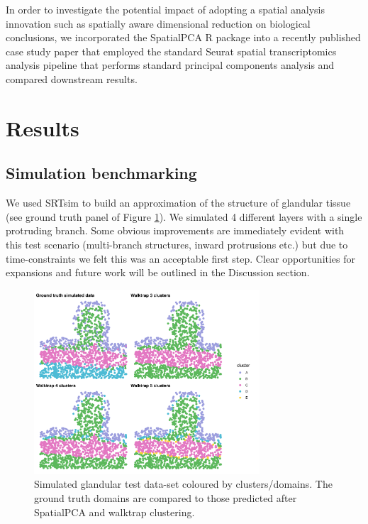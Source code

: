 \documentclass{article}
\begin{document}
In order to investigate the potential impact of adopting a spatial analysis innovation such as spatially aware dimensional reduction on biological conclusions, we incorporated the SpatialPCA R package into a recently published case study paper that employed the standard Seurat spatial transcriptomics analysis pipeline that performs standard principal components analysis and compared downstream results.

\section*{Results}

\subsection*{Simulation benchmarking}

We used SRTsim to build an approximation of the structure of glandular tissue (see ground truth panel of Figure \ref{fig:simclustplot}). We simulated 4 different layers with a single protruding branch. Some obvious improvements are immediately evident with this test scenario (multi-branch structures, inward protrusions etc.) but due to time-constraints we felt this was an acceptable first step. Clear opportunities for expansions and future work will be outlined in the Discussion section. 

\begin{figure}[h!]
    \centering
    \includegraphics[width=0.75\textwidth]{images/clusters_plot.png}
    \caption{Simulated glandular test data-set coloured by clusters/domains. The ground truth domains are compared to those predicted after SpatialPCA and walktrap clustering.}
    \label{fig:simclustplot}
\end{figure}
\end{document}
